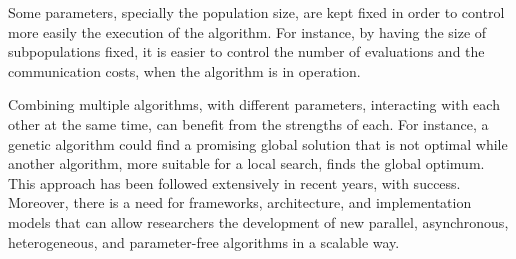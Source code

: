 \documentclass[review]{elsarticle}
\begin{document}
Some parameters, specially the population size, are
kept fixed in order to control more easily the execution of the algorithm. For
instance, by having the size of subpopulations fixed, it is easier to control
the number of evaluations and the communication costs, when the algorithm is in
operation. %

Combining multiple algorithms, with different parameters, interacting with each
other at the same time, can benefit from the strengths of each. For instance, a
genetic algorithm could find a promising global solution that is not optimal
while another algorithm, more suitable for a local search, finds the global
optimum. This approach has been followed extensively in recent years, with
success. %
Moreover, there is a need for frameworks, architecture, and
implementation models that can allow researchers the development of new
parallel, asynchronous, heterogeneous, and parameter-free algorithms in a scalable way.  




\end{document}
